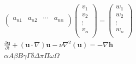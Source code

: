 \documentclass{article}  %
\begin{document}
\begin{gather*}
\begin{pmatrix}
a_{n1} & a_{n2} & \cdots & a_{nn} \\
\end{pmatrix}
\begin{pmatrix}
v_1 \\
v_2 \\
\vdots \\
v_n \\
\end{pmatrix}
=
\begin{pmatrix}
w_1 \\
w_2 \\
\vdots \\
w_n \\
\end{pmatrix}\\[0.3cm]
\frac{\partial \textbf{u}}{\partial t} + (\textbf{u}\cdot\nabla)\textbf{u}		%
-\nu\nabla^{2}(\textbf{u}) = -\nabla\textbf{h}\\[0.4cm]
\alpha A\beta B\gamma \Gamma \delta\Delta\pi\Pi\omega\Omega\\	%
\end{gather*}	%
\end{document}
